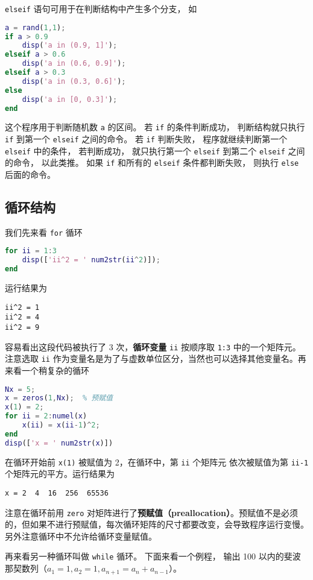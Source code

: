 \verb|elseif| 语句可用于在判断结构中产生多个分支， 如

\begin{lstlisting}[language=matlab]
a = rand(1,1);
if a > 0.9
    disp('a in (0.9, 1]');
elseif a > 0.6
    disp('a in (0.6, 0.9]');
elseif a > 0.3
    disp('a in (0.3, 0.6]');
else
    disp('a in [0, 0.3]');
end
\end{lstlisting}

这个程序用于判断随机数 \verb|a| 的区间。 若 \verb|if| 的条件判断成功， 判断结构就只执行 \verb|if| 到第一个 \verb|elseif| 之间的命令。 若 \verb|if| 判断失败， 程序就继续判断第一个 \verb|elseif| 中的条件， 若判断成功， 就只执行第一个 \verb|elseif| 到第二个 \verb|elseif| 之间的命令， 以此类推。 如果 \verb|if| 和所有的 \verb|elseif| 条件都判断失败， 则执行 \verb|else| 后面的命令。

\subsection{循环结构}
我们先来看 \verb|for| 循环

\begin{lstlisting}[language=matlab]
for ii = 1:3
    disp(['ii^2 = ' num2str(ii^2)]);
end
\end{lstlisting}

运行结果为
\begin{lstlisting}[language=matlabC]
ii^2 = 1
ii^2 = 4
ii^2 = 9
\end{lstlisting}
容易看出这段代码被执行了 3 次，\textbf{循环变量} \verb|ii| 按顺序取 \verb|1:3| 中的一个矩阵元。注意选取 \verb|ii| 作为变量名是为了与虚数单位区分，当然也可以选择其他变量名。再来看一个稍复杂的循环

\begin{lstlisting}[language=matlab]
Nx = 5;
x = zeros(1,Nx);  % 预赋值
x(1) = 2;
for ii = 2:numel(x)
    x(ii) = x(ii-1)^2;
end
disp(['x = ' num2str(x)])
\end{lstlisting}

在循环开始前 \verb|x(1)| 被赋值为 2，在循环中，第 \verb|ii| 个矩阵元 依次被赋值为第 \verb|ii-1| 个矩阵元的平方。运行结果为
\begin{lstlisting}[language=matlabC]
x = 2  4  16  256  65536
\end{lstlisting}
注意在循环前用 \verb|zero| 对矩阵进行了\textbf{预赋值（preallocation）}。预赋值不是必须的，但如果不进行预赋值，每次循环矩阵的尺寸都要改变，会导致程序运行变慢。另外注意循环中不允许给循环变量赋值。

再来看另一种循环叫做 \verb|while| 循环。 下面来看一个例程， 输出 100 以内的斐波那契数列（$a_1 = 1, a_2 = 1, a_{n+1} = a_{n} + a_{n-1}$）。

